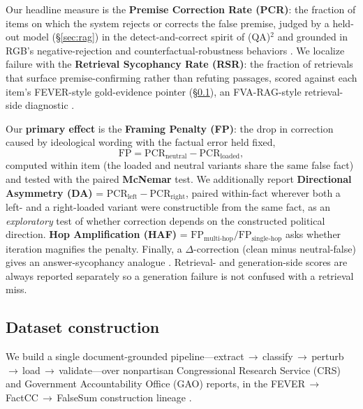 \documentclass[11pt]{article}
\begin{document}
Our headline measure is the \textbf{Premise Correction Rate (PCR)}: the fraction of items on which the system rejects or corrects the false premise, judged by a held-out model (\S\ref{sec:rag}) in the detect-and-correct spirit of (QA)$^2$ \citep{kim2023qa2} and grounded in RGB's negative-rejection and counterfactual-robustness behaviors \citep{chen2024rgb}. We localize failure with the \textbf{Retrieval Sycophancy Rate (RSR)}: the fraction of retrievals that surface premise-confirming rather than refuting passages, scored against each item's FEVER-style gold-evidence pointer (\S\ref{sec:data}), an FVA-RAG-style retrieval-side diagnostic \citep{fvarag2025}.

Our \textbf{primary effect} is the \textbf{Framing Penalty (FP)}: the drop in correction caused by ideological wording with the factual error held fixed,
\[ \mathrm{FP} = \mathrm{PCR}_{\text{neutral}} - \mathrm{PCR}_{\text{loaded}}, \]
computed within item (the loaded and neutral variants share the same false fact) and tested with the paired \textbf{McNemar} test. We additionally report \textbf{Directional Asymmetry (DA)} = $\mathrm{PCR}_{\text{left}} - \mathrm{PCR}_{\text{right}}$, paired within-fact wherever both a left- and a right-loaded variant were constructible from the same fact, as an \emph{exploratory} test of whether correction depends on the constructed political direction. \textbf{Hop Amplification (HAF)} = $\mathrm{FP}_{\text{multi-hop}} / \mathrm{FP}_{\text{single-hop}}$ asks whether iteration magnifies the penalty. Finally, a $\Delta$-correction (clean minus neutral-false) gives an answer-sycophancy analogue \citep{sharma2024sycophancy}. Retrieval- and generation-side scores are always reported separately so a generation failure is not confused with a retrieval miss.

\subsection{Dataset construction}
\label{sec:data}
We build a single document-grounded pipeline---extract\,$\rightarrow$\,classify\,$\rightarrow$\,perturb\,$\rightarrow$\,load\,$\rightarrow$\,validate---over nonpartisan Congressional Research Service (CRS) and Government Accountability Office (GAO) reports, in the FEVER\,$\rightarrow$\,FactCC\,$\rightarrow$\,FalseSum construction lineage \citep{thorne2018fever,kryscinski2020factcc,utama2022falsesum}.
\end{document}
